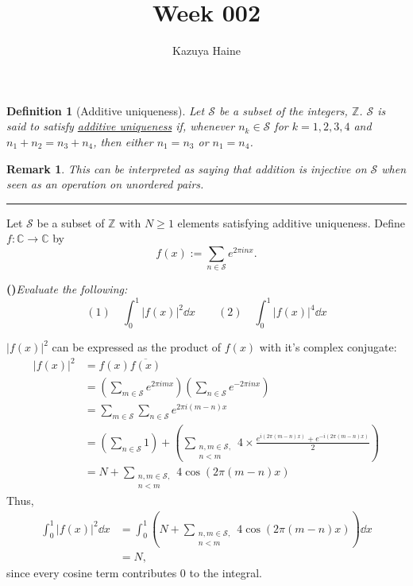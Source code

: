 \documentclass{amsart}
\title{Week 002}
\author{Kazuya Haine}
\date{}
\newcommand{\Z}{\mathbb{Z}}
\newcommand{\C}{\mathbb{C}}
\newcommand{\calS}{\mathcal{S}}
\newtheorem*{definition}{Definition}
\newtheorem*{remark}{Remark}
\newcounter{qpart}
\newcommand{\qpart}[1]{%
  \stepcounter{qpart}%
  \bigskip\noindent\textbf{(\alph{qpart})}\quad\textit{#1}\par\bigskip%
}
\begin{document}
\maketitle

\begin{definition}[Additive uniqueness]
    Let $\calS$ be a subset of the integers, $\Z$. $\calS$ is said to satisfy \underline{additive uniqueness} if, whenever $n_k \in \calS$ for $k = 1,2,3,4$ and $n_1 + n_2 = n_3 + n_4$, then either $n_1 = n_3$ or $n_1 = n_4$.
\end{definition}
\begin{remark}
    This can be interpreted as saying that addition is injective on $\calS$ when seen as an operation on unordered pairs.
\end{remark}
\begin{center}
\rule{0.9\textwidth}{0.5pt}
\end{center}

\bigskip
\noindent
Let $\calS$ be a subset of $\Z$ with $N \ge 1$ elements satisfying additive uniqueness. Define $f \colon \C \to \C$ by
\begin{equation*}
    f(x) := \sum_{n\in\calS} e^{2\pi inx}.
\end{equation*}

\qpart{Evaluate the following: \begin{equation*} (1) \quad \int_0^1 |f(x)|^2 \dd{x} \qquad (2) \quad \int_0^1 |f(x)|^4 \dd{x}\end{equation*}}

\noindent
$|f(x)|^2$ can be expressed as the product of $f(x)$ with it's complex conjugate:
\begin{align*}
    |f(x)|^2 &= f(x) \overline{f(x)} \\
             &= \left(\sum_{m \in \calS} e^{2\pi imx}\right)\left(\sum_{n \in \calS} e^{-2\pi inx}\right) \\
             &= \sum_{m \in \calS} \sum_{n \in \calS} e^{2\pi i(m-n)x} \\
             &= \left(\sum_{n \in \calS} 1\right) + \left(\sum_{\substack{n,m \in \calS, \\ n < m}} 4\times\frac{e^{i(2\pi(m-n)x)} + e^{-i(2\pi(m-n)x)}}{2}\right) \\
             &= N + \sum_{\substack{n,m \in \calS, \\ n < m}} 4\cos(2\pi(m-n)x)
\end{align*}
Thus, 
\begin{align*}
    \int_0^1 |f(x)|^2 \dd{x} &= \int_0^1 \left(N + \sum_{\substack{n,m \in \calS, \\ n < m}} 4\cos(2\pi(m-n)x) \right)\dd{x} \\
                             &= N,
\end{align*}
since every cosine term contributes 0 to the integral.
\end{document}
